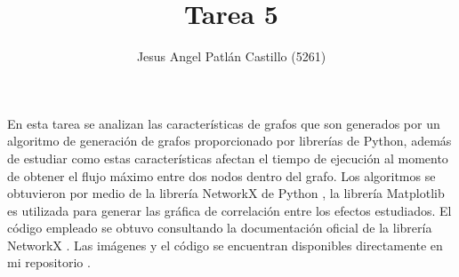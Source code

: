 \documentclass{article}
\title{Tarea 5}
\author{Jesus Angel Patlán Castillo (5261)}
\date{\displaydate{date}}
\begin{document}
 
 
\lstset{style=mystyle}


\maketitle
En esta tarea se analizan las características de grafos que son generados por un algoritmo de generación de grafos proporcionado por librerías de Python, además de estudiar como estas características afectan el tiempo de ejecución al momento de obtener el flujo máximo entre dos nodos dentro del grafo. Los algoritmos se obtuvieron por medio de la librería NetworkX \cite{NetworkX} de Python \cite{Python}, la librería Matplotlib \cite{Matplotlib} es utilizada para generar las gráfica de correlación entre los efectos estudiados. El código empleado se obtuvo consultando la documentación oficial de la librería NetworkX \cite{NetworkXD}. Las imágenes y el código se encuentran disponibles directamente en mi repositorio \cite{JAPC}.
\end{document}
